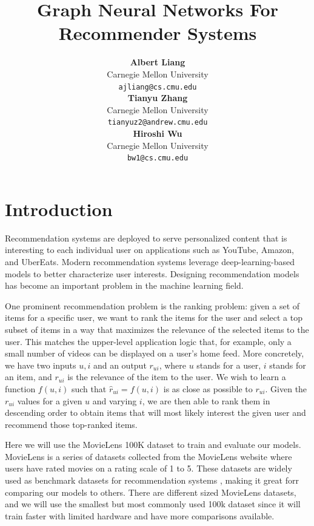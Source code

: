 \documentclass{article}
\title{Graph Neural Networks For Recommender Systems}
\author{
  \textbf{Albert Liang}  \\
  Carnegie Mellon University \\
  \texttt{ajliang@cs.cmu.edu} \\
  \And
  \textbf{Tianyu Zhang} \\
  Carnegie Mellon University \\
  \texttt{tianyuz2@andrew.cmu.edu} \\
  \And
  \textbf{Hiroshi Wu} \\
  Carnegie Mellon University \\
  \texttt{bw1@cs.cmu.edu} \\
}
\begin{document}
\maketitle



\section{Introduction} \label{intro}


Recommendation systems are deployed to serve personalized content that is interesting to each individual user on applications such as YouTube, Amazon, and UberEats. Modern recommendation systems leverage deep-learning-based models to better characterize user interests. Designing recommendation models has become an important problem in the machine learning field.

One prominent recommendation problem is the ranking problem: given a set of items for a specific user, we want to rank the items for the user and select a top subset of items in a way that maximizes the relevance of the selected items to the user. This matches the upper-level application logic that, for example, only a small number of videos can be displayed on a user's home feed. More concretely, we have two inputs $u,i$ and an output $r_{ui}$, where $u$ stands for a user, $i$ stands for an item, and $r_{ui}$ is the relevance of the item to the user. We wish to learn a function $f(u,i)$ such that $\hat{r}_{ui}=f(u,i)$ is as close as possible to $r_{ui}$. Given the $r_{ui}$ values for a given $u$ and varying $i$, we are then able to rank them in descending order to obtain items that will most likely interest the given user and recommend those top-ranked items.

Here we will use the MovieLens 100K \cite{movielens} dataset to train and evaluate our models. MovieLens is a series of datasets collected from the MovieLens website where users have rated movies on a rating scale of 1 to 5. These datasets are widely used as benchmark datasets for recommendation systems \cite{DBLP:journals/corr/abs-2011-02260}, making it great forr comparing our models to others. There are different sized MovieLens datasets, and we will use the smallest but most commonly used 100k dataset since it will train faster with limited hardware and have more comparisons available. 
\end{document}
